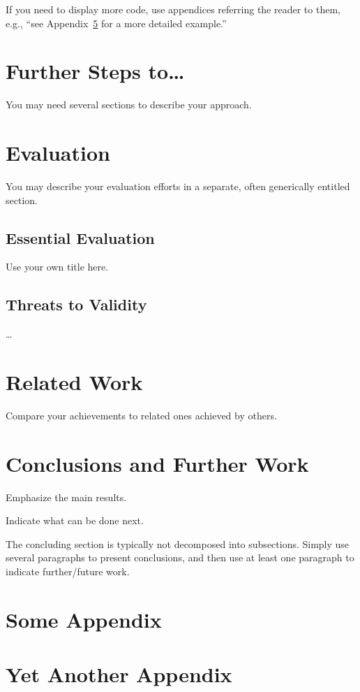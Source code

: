 \documentclass[11pt,english,a4paper,twoside]{article}
\begin{document}
If you need to display more code, use appendices referring the reader to them,
e.g., ``see Appendix~\ref{some} for a more detailed example.''



\section{Further Steps to\ldots} \label{further}

You may need several sections to describe your approach.



\section{Evaluation} \label{eval}

You may describe your evaluation efforts in a separate, often generically
entitled section.

\subsection{Essential Evaluation} \label{eval-essential}

Use your own title here.

\subsection{Threats to Validity} \label{eval-threats}

\ldots



\section{Related Work} \label{rw}

Compare your achievements to related ones achieved by others.



\section{Conclusions and Further Work} \label{cc}

Emphasize the main results.

Indicate what can be done next.

The concluding section is typically not decomposed into subsections.
Simply use several paragraphs to present conclusions,
and then use at least one paragraph to indicate further/future work.




\appendix
\section{Some Appendix} \label{some}


\section{Yet Another Appendix} \label{yetanother}
\end{document}
